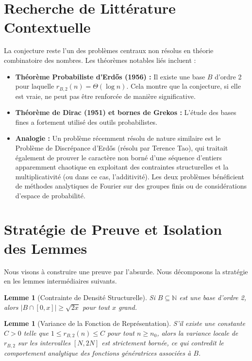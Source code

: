 \documentclass[12pt, a4paper]{article}
\newtheorem{lemma}[theorem]{Lemme}
\theoremstyle{definition}
\begin{document}
\section{Recherche de Littérature Contextuelle}
La conjecture reste l'un des problèmes centraux non résolus en théorie combinatoire des nombres.
Les théorèmes notables liés incluent :
\begin{itemize}
    \item \textbf{Théorème Probabiliste d'Erd\H{o}s (1956) :} Il existe une base $B$ d'ordre 2 pour laquelle $r_{B,2}(n) = \Theta(\log n)$. Cela montre que la conjecture, si elle est vraie, ne peut pas être renforcée de manière significative.
    \item \textbf{Théorème de Dirac (1951) et bornes de Grekos :} L'étude des bases fines a fortement utilisé des outils probabilistes.
    \item \textbf{Analogie :} Un problème récemment résolu de nature similaire est le Problème de Discrépance d'Erd\H{o}s (résolu par Terence Tao), qui traitait également de prouver le caractère non borné d'une séquence d'entiers apparemment chaotique en exploitant des contraintes structurelles et la multiplicativité (ou dans ce cas, l'additivité). Les deux problèmes bénéficient de méthodes analytiques de Fourier sur des groupes finis ou de considérations d'espace de probabilité.
\end{itemize}

\section{Stratégie de Preuve et Isolation des Lemmes}
Nous visons à construire une preuve par l'absurde. Nous décomposons la stratégie en les lemmes intermédiaires suivants.

\begin{lemma}[Contrainte de Densité Structurelle]
Si $B \subseteq \mathbb{N}$ est une base d'ordre 2, alors $|B \cap [0, x]| \ge \sqrt{2x}$ pour tout $x$ grand.
\end{lemma}

\begin{lemma}[Variance de la Fonction de Représentation]
S'il existe une constante $C > 0$ telle que $1 \le r_{B,2}(n) \le C$ pour tout $n \ge n_0$, alors la variance locale de $r_{B,2}$ sur les intervalles $[N, 2N]$ est strictement bornée, ce qui contredit le comportement analytique des fonctions génératrices associées à $B$.
\end{lemma}
\end{document}
